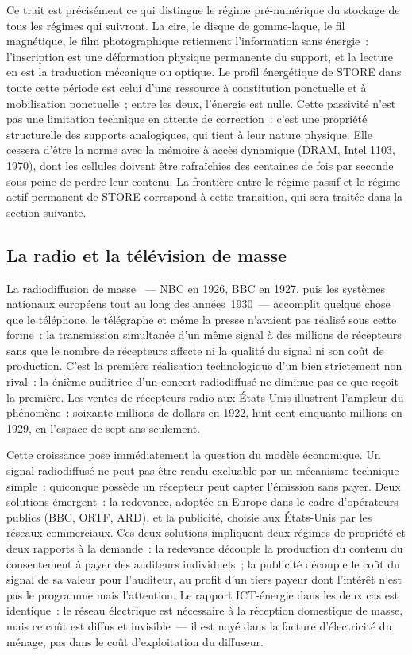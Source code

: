 Ce trait est précisément ce qui distingue le régime pré-numérique du stockage de tous les régimes qui suivront. La cire, le disque de gomme-laque, le fil magnétique, le film photographique retiennent l'information sans énergie~: l'inscription est une déformation physique permanente du support, et la lecture en est la traduction mécanique ou optique. Le profil énergétique de STORE dans toute cette période est celui d'une ressource à constitution ponctuelle et à mobilisation ponctuelle~; entre les deux, l'énergie est nulle. Cette passivité n'est pas une limitation technique en attente de correction~: c'est une propriété structurelle des supports analogiques, qui tient à leur nature physique. Elle cessera d'être la norme avec la mémoire à accès dynamique (DRAM, Intel 1103, 1970), dont les cellules doivent être rafraîchies des centaines de fois par seconde sous peine de perdre leur contenu. La frontière entre le régime passif et le régime actif-permanent de STORE correspond à cette transition, qui sera traitée dans la section suivante.


\subsection{La radio et la télévision de masse}\label{subsec:broadcasting_mass}

%
La radiodiffusion de masse ~--- NBC en 1926, BBC en 1927, puis les systèmes nationaux européens tout au long des années~1930~--- accomplit quelque chose que le téléphone, le télégraphe et même la presse n'avaient pas réalisé sous cette forme~: la transmission simultanée d'un même signal à des millions de récepteurs sans que le nombre de récepteurs affecte ni la qualité du signal ni son coût de production. C'est la première réalisation technologique d'un bien strictement non rival~: la énième auditrice d'un concert radiodiffusé ne diminue pas ce que reçoit la première. Les ventes de récepteurs radio aux États-Unis illustrent l'ampleur du phénomène~: soixante millions de dollars en 1922, huit cent cinquante millions en 1929, en l'espace de sept ans seulement.

%
Cette croissance pose immédiatement la question du modèle économique. Un signal radiodiffusé ne peut pas être rendu excluable par un mécanisme technique simple~: quiconque possède un récepteur peut capter l'émission sans payer. Deux solutions émergent~: la redevance, adoptée en Europe dans le cadre d'opérateurs publics (BBC, ORTF, ARD), et la publicité, choisie aux États-Unis par les réseaux commerciaux. Ces deux solutions impliquent deux régimes de propriété et deux rapports à la demande~: la redevance découple la production du contenu du consentement à payer des auditeurs individuels~; la publicité découple le coût du signal de sa valeur pour l'auditeur, au profit d'un tiers payeur dont l'intérêt n'est pas le programme mais l'attention. Le rapport ICT-énergie dans les deux cas est identique~: le réseau électrique est nécessaire à la réception domestique de masse, mais ce coût est diffus et invisible~--- il est noyé dans la facture d'électricité du ménage, pas dans le coût d'exploitation du diffuseur.


